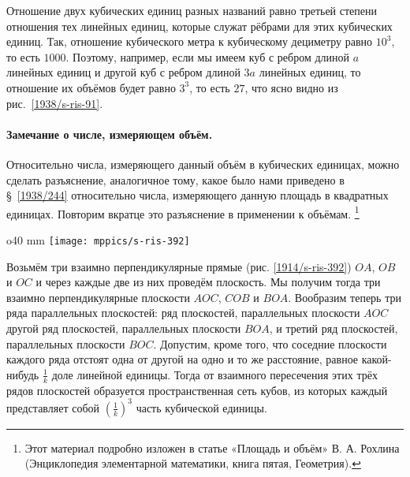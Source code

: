Отношение двух кубических единиц разных названий равно третьей степени отношения тех линейных единиц, которые служат рёбрами для этих кубических единиц.
Так, отношение кубического метра к кубическому дециметру равно $10^3$, то есть $1000$.
Поэтому, например, если мы имеем куб с ребром длиной $a$ линейных единиц и другой куб с ребром длиной $3a$ линейных единиц, то отношение их объёмов будет равно $3^3$, то есть $27$, что ясно видно из рис.~\ref{1938/s-ris-91}.

{\small

\paragraph{Замечание о числе, измеряющем объём.}\label{1930/366}
Относительно числа, измеряющего данный объём в кубических единицах, можно сделать разъяснение, аналогичное тому, какое было нами приведено в §~\ref{1938/244}
относительно числа, измеряющего данную площадь в квадратных единицах.
Повторим вкратце это разъяснение в применении к объёмам.%
\footnote{Этот материал подробно изложен в статье «Площадь и объём» В. А. Рохлина (Энциклопедия элементарной математики, книга пятая, Геометрия).}

\begin{wrapfigure}{o}{40 mm}
\vskip-0mm
\centering
\texttt{[image: mppics/s-ris-392]}
\caption{}\label{1914/s-ris-392}
\vskip-0mm
\end{wrapfigure}

Возьмём три взаимно перпендикулярные прямые (рис. \ref{1914/s-ris-392}) $OA$, $OB$ и $OC$ и через каждые две из них проведём плоскость.
Мы получим тогда три взаимно перпендикулярные плоскости $AOC$, $COB$ и $BOA$.
Вообразим теперь три ряда параллельных плоскостей: ряд плоскостей, параллельных плоскости $AOC$ другой ряд плоскостей, параллельных плоскости $BOA$, и третий ряд плоскостей, параллельных плоскости $BOC$.
Допустим, кроме того, что соседние плоскости каждого ряда отстоят одна от другой на одно и то же расстояние, равное какой-нибудь $\tfrac1k$ доле линейной единицы.
Тогда от взаимного пересечения этих трёх рядов плоскостей образуется пространственная сеть кубов, из которых каждый представляет собой $(\tfrac1k)^3$ часть кубической единицы.

}
